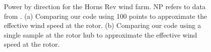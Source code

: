 \documentclass[conf]{new-aiaa}
\begin{document}
\begin{figure}[htbp!]
	\centering
	\caption{Power by direction for the Horns Rev wind farm. NP refers to data from \cite{niayifar2016}. (a) Comparing our code using 100 points to approximate the effective wind speed at the rotor. (b) Comparing our code using a single sample at the rotor hub to approximate the effective wind speed at the rotor.}
	
	\label{fig:power_direction}
\end{figure}
\end{document}
